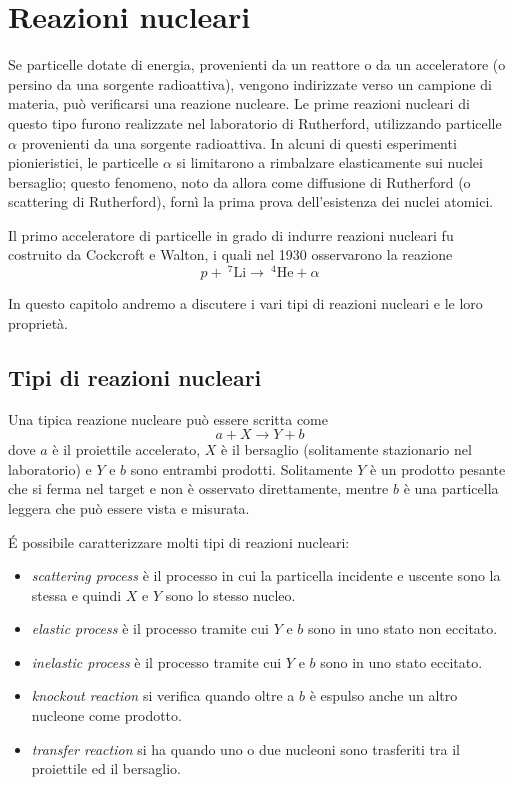 \chapter{Reazioni nucleari}

Se particelle dotate di energia, provenienti da un reattore o da un acceleratore (o persino da una sorgente radioattiva), vengono indirizzate verso un campione di materia, può verificarsi una reazione nucleare. Le prime reazioni nucleari di questo tipo furono realizzate nel laboratorio di Rutherford, utilizzando particelle $\alpha$ provenienti da una sorgente radioattiva. In alcuni di questi esperimenti pionieristici, le particelle $\alpha$ si limitarono a rimbalzare elasticamente sui nuclei bersaglio; questo fenomeno, noto da allora come diffusione di Rutherford (o scattering di Rutherford), fornì la prima prova dell'esistenza dei nuclei atomici.

Il primo acceleratore di particelle in grado di indurre reazioni nucleari fu costruito da Cockcroft e Walton, i quali nel 1930 osservarono la reazione
\begin{equation*}
    p + \ ^{7}\text{Li} \to \ ^{4}\text{He} + \alpha
\end{equation*}

In questo capitolo andremo a discutere i vari tipi di reazioni nucleari e le loro proprietà. 

\section{Tipi di reazioni nucleari}

Una tipica reazione nucleare può essere scritta come 
\begin{equation}
    a + X \to Y + b 
\end{equation}
dove $a$ è il proiettile accelerato, $X$ è il bersaglio (solitamente stazionario nel laboratorio) e $Y$ e $b$ sono entrambi prodotti. Solitamente $Y$ è un prodotto pesante che si ferma nel target e non è osservato direttamente, mentre $b$ è una particella leggera che può essere vista e misurata. 

\'E possibile caratterizzare molti tipi di reazioni nucleari:
\begin{itemize}
    \item \emph{scattering process} è il processo in cui la particella incidente e uscente sono la stessa e quindi $X$ e $Y$ sono lo stesso nucleo.
    \item \emph{elastic process} è il processo tramite cui $Y$ e $b$ sono in uno stato non eccitato.
    \item \emph{inelastic process} è il processo tramite cui $Y$ e $b$ sono in uno stato eccitato.
    \item \emph{knockout reaction} si verifica quando oltre a $b$ è espulso anche un altro nucleone come prodotto. 
    \item \emph{transfer reaction} si ha quando uno o due nucleoni sono trasferiti tra il proiettile ed il bersaglio. 
\end{itemize}

